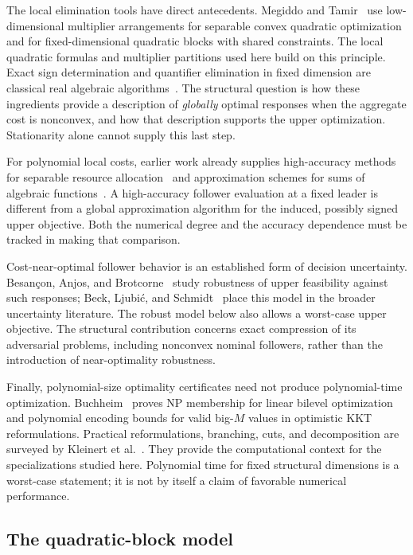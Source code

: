 The local elimination tools have direct antecedents. Megiddo and
Tamir~\cite{MegiddoTamir1993} use low-dimensional multiplier arrangements
for separable convex quadratic optimization and for fixed-dimensional
quadratic blocks with shared constraints. The local quadratic formulas
and multiplier partitions used here build on this principle. Exact sign
determination and quantifier elimination in fixed dimension are classical
real algebraic algorithms~\cite{BasuPollackRoy1996}. The structural question
is how these ingredients provide a description of \emph{globally} optimal
responses when the aggregate cost is nonconvex, and how that description
supports the upper optimization. Stationarity alone cannot supply this
last step.

For polynomial local costs, earlier work already supplies high-accuracy
methods for separable resource allocation~\cite{HochbaumShanthikumar1990}
and approximation schemes for sums of algebraic
functions~\cite{Vigneron2014}. A high-accuracy follower evaluation at a
fixed leader is different from a global approximation algorithm for the
induced, possibly signed upper objective. Both the numerical degree and
the accuracy dependence must be tracked in making that comparison.

Cost-near-optimal follower behavior is an established form of decision
uncertainty. Besan\c{c}on, Anjos, and Brotcorne~\cite{BesanconAnjosBrotcorne2024}
study robustness of upper feasibility against such responses;
Beck, Ljubi\'c, and Schmidt~\cite{BeckLjubicSchmidt2023} place this model in
the broader uncertainty literature. The robust model below also allows a
worst-case upper objective. The structural contribution concerns exact
compression of its adversarial problems, including nonconvex nominal
followers, rather than the introduction of near-optimality robustness.

Finally, polynomial-size optimality certificates need not produce
polynomial-time optimization. Buchheim~\cite{Buchheim2023} proves NP
membership for linear bilevel optimization and polynomial encoding bounds
for valid big-$M$ values in optimistic KKT reformulations. Practical
reformulations, branching, cuts, and decomposition are surveyed by
Kleinert et al.~\cite{KleinertEtAl2021}. They provide the computational
context for the specializations studied here. Polynomial time for fixed
structural dimensions is a worst-case statement; it is not by itself a
claim of favorable numerical performance.

\subsection{The quadratic-block model}\label{subsec:model}

